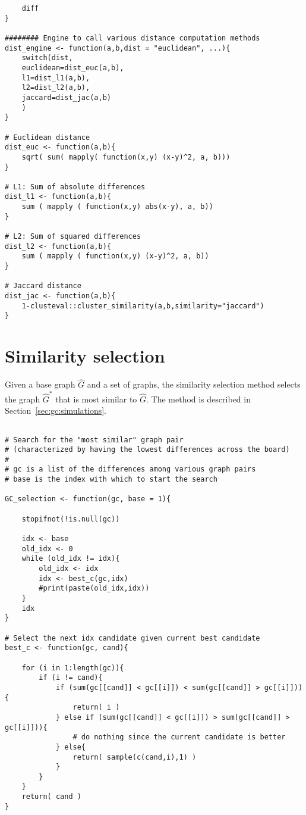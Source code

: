 {\begin{lstlisting}
	diff
}

######## Engine to call various distance computation methods
dist_engine <- function(a,b,dist = "euclidean", ...){
	switch(dist,
	euclidean=dist_euc(a,b),
	l1=dist_l1(a,b),
	l2=dist_l2(a,b),
	jaccard=dist_jac(a,b)
	)
}

# Euclidean distance
dist_euc <- function(a,b){
	sqrt( sum( mapply( function(x,y) (x-y)^2, a, b)))
}

# L1: Sum of absolute differences
dist_l1 <- function(a,b){
	sum ( mapply ( function(x,y) abs(x-y), a, b))
}

# L2: Sum of squared differences
dist_l2 <- function(a,b){
	sum ( mapply ( function(x,y) (x-y)^2, a, b))
}

# Jaccard distance
dist_jac <- function(a,b){
	1-clusteval::cluster_similarity(a,b,similarity="jaccard")
}
\end{lstlisting}

}


\section{Similarity selection}
\label{sec:appendicies:gc:similarity}

Given a base graph $\hat{G}$ and a set of graphs, the similarity selection 
method selects the graph $\hat{G}^*$ that is most similar to $\hat{G}$. The 
method is 
described in Section~\ref{sec:gc:simulations}.

{
\begin{lstlisting}

# Search for the "most similar" graph pair
# (characterized by having the lowest differences across the board)
#
# gc is a list of the differences among various graph pairs
# base is the index with which to start the search

GC_selection <- function(gc, base = 1){
	
	stopifnot(!is.null(gc))
	
	idx <- base
	old_idx <- 0
	while (old_idx != idx){
		old_idx <- idx
		idx <- best_c(gc,idx)
		#print(paste(old_idx,idx))
	}
	idx
}

# Select the next idx candidate given current best candidate
best_c <- function(gc, cand){

	for (i in 1:length(gc)){
		if (i != cand){
			if (sum(gc[[cand]] < gc[[i]]) < sum(gc[[cand]] > gc[[i]])){
				return( i )
			} else if (sum(gc[[cand]] < gc[[i]]) > sum(gc[[cand]] > gc[[i]])){
				# do nothing since the current candidate is better
			} else{
				return( sample(c(cand,i),1) )
			}
		}
	}
	return( cand )  
}
\end{lstlisting}
}


